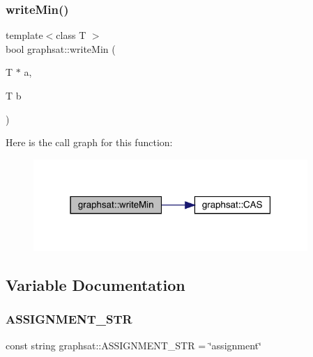\subsubsection{\texorpdfstring{writeMin()}{writeMin()}}
{\footnotesize\ttfamily template$<$class T $>$ \\
bool graphsat\+::write\+Min (\begin{DoxyParamCaption}\item[{T $\ast$}]{a,  }\item[{T}]{b }\end{DoxyParamCaption})\hspace{0.3cm}{\ttfamily [inline]}}

Here is the call graph for this function\+:
\nopagebreak
\begin{figure}[H]
\begin{center}
\leavevmode
\includegraphics[width=295pt]{namespacegraphsat_af93904918cd008fe84acebf0fec34ae3_cgraph}
\end{center}
\end{figure}


\subsection{Variable Documentation}
\mbox{\label{namespacegraphsat_ad52aff2b01d385e5c1f1d2ad4200458b}} 
\subsubsection{\texorpdfstring{ASSIGNMENT\_STR}{ASSIGNMENT\_STR}}
{\footnotesize\ttfamily const string graphsat\+::\+A\+S\+S\+I\+G\+N\+M\+E\+N\+T\+\_\+\+S\+TR = \char`\"{}assignment\char`\"{}\hspace{0.3cm}{\ttfamily [static]}}

\mbox{\label{namespacegraphsat_a269b206579756e8974a5efe610e10a9e}} 

